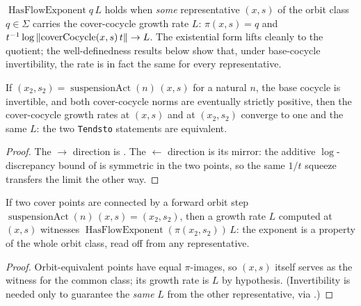\begin{definition}\label{thm:susp-hasFlow}
  \leanok
  $\operatorname{HasFlowExponent} q\,L$ holds when \emph{some} representative $(x, s)$ of the
  orbit class $q \in \Sigma$ carries the cover-cocycle growth rate $L$:
  $\pi(x, s) = q$ and $t^{-1}\log\left\lVert \operatorname{coverCocycle}(x, s)\,t \right\rVert \to L$. The
  existential form lifts cleanly to the quotient; the well-definedness results below show that,
  under base-cocycle invertibility, the rate is in fact the same for every representative.
\end{definition}

\begin{theorem}\label{thm:susp-iffForward}
  \leanok
  If $(x_2, s_2) = \operatorname{suspensionAct}(n)\,(x, s)$ for a natural $n$, the base cocycle
  is invertible, and both cover-cocycle norms are eventually strictly positive, then the
  cover-cocycle growth rates at $(x, s)$ and at $(x_2, s_2)$ converge to one and the same $L$:
  the two \texttt{Tendsto} statements are equivalent.
\end{theorem}
\begin{proof}\leanok
  The $\to$ direction is . The $\leftarrow$ direction is its mirror:
  the additive $\log$-discrepancy bound of  is symmetric in the two points,
  so the same $1/t$ squeeze transfers the limit the other way.
\end{proof}

\begin{theorem}\label{thm:susp-classInv}
  \leanok
  If two cover points are connected by a forward orbit step
  $\operatorname{suspensionAct}(n)\,(x, s) = (x_2, s_2)$, then a growth rate $L$ computed at
  $(x, s)$ witnesses $\operatorname{HasFlowExponent}(\pi(x_2, s_2))\,L$: the exponent is a
  property of the whole orbit class, read off from any representative.
\end{theorem}
\begin{proof}\leanok
  Orbit-equivalent points have equal $\pi$-images, so $(x, s)$ itself serves as the witness for
  the common class; its growth rate is $L$ by hypothesis. (Invertibility is needed only to
  guarantee the \emph{same} $L$ from the other representative, via .)
\end{proof}


